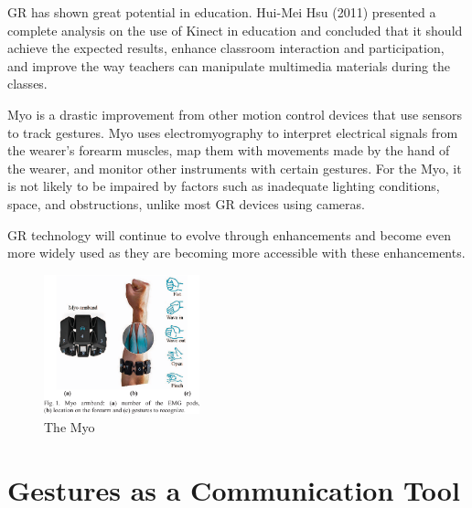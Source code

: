 \documentclass{article}
\begin{document}
GR has shown great potential in education. Hui-Mei Hsu (2011) presented a complete analysis on the use of Kinect in education and concluded that it should achieve the expected results, enhance classroom interaction and participation, and improve the way teachers can manipulate multimedia materials during the classes.

Myo is a drastic improvement from other motion control devices that use sensors to track gestures. Myo uses electromyography to interpret electrical signals from the wearer's forearm muscles, map them with movements made by the hand of the wearer, and monitor other instruments with certain gestures. For the Myo, it is not likely to be impaired by factors such as inadequate lighting conditions, space, and obstructions, unlike most GR devices using cameras. 
\cite{ref13}

GR technology will continue to evolve through enhancements and become even more widely used as they are becoming more accessible with these enhancements.

\begin{figure}[!ht]
    \caption{The Myo}
    \label{image:MYO}
    \centering
    \includegraphics[width=0.4\textwidth]{pics/myo.png}
\end{figure}


\section{Gestures as a Communication Tool}
\end{document}
